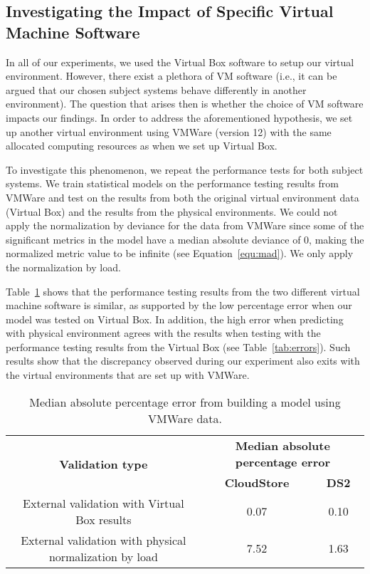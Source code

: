 \subsection{Investigating the Impact of Specific Virtual Machine Software}

In all of our experiments, we used the Virtual Box software to setup our virtual environment. However, there exist a plethora of VM software (i.e., it can be argued that our chosen subject systems behave differently in another environment). The question that arises then is whether the choice of VM software impacts our findings. In order to address the aforementioned hypothesis, we set up another virtual environment using VMWare (version 12) with the same allocated computing resources as when we set up Virtual Box.

To investigate this phenomenon, we repeat the performance tests for both subject systems. We train statistical models on the performance testing results from VMWare and test on the results from both the original virtual environment data (Virtual Box) and the results from the physical environments. We could not apply the normalization by deviance for the data from VMWare since some of the significant metrics in the model have a median absolute deviance of 0, making the normalized metric value to be infinite (see Equation~\ref{equ:mad}). We only apply the normalization by load. 

Table~\ref{tab:vmware} shows that the performance testing results from the two different virtual machine software is similar, as supported by the low percentage error when our model was tested on Virtual Box. In addition, the high error when predicting with physical environment agrees with the results when testing with the performance testing results from the Virtual Box (see Table~\ref{tab:errors}). Such results show that the discrepancy observed during our experiment also exits with the virtual environments that are set up with VMWare.

\begin{table}[tbh]
	\centering
	\caption{Median absolute percentage error from building a model using VMWare data.}
	\label{tab:vmware}
		\begin{tabular}{|c||c|c|}
			\hline
			\multirow{2}{*}{\textbf{Validation type}} & \multicolumn{2}{c|}{\textbf{Median absolute percentage error}} \\ \cline{2-3} 
			& \textbf{CloudStore} & \textbf{DS2} \\ %
			\midrule
			\midrule
			External validation with Virtual Box results& 0.07&0.10\\ \hline
			External validation with physical normalization by load & 7.52& 1.63 \\ \hline
		\end{tabular}
\end{table}

